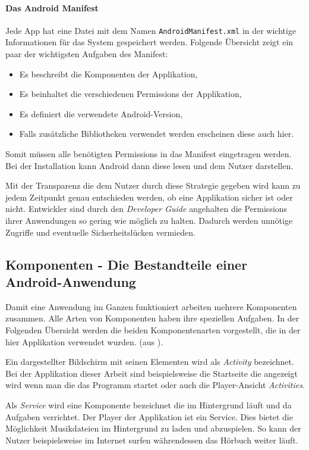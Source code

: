 \paragraph{Das Android Manifest}
Jede App hat eine Datei mit dem Namen \verb+AndroidManifest.xml+ in der wichtige Informationen für das System gespeichert werden. Folgende Übersicht zeigt ein paar der wichtigsten Aufgaben des Manifest:

\begin{itemize}
	\item Es beschreibt die Komponenten der Applikation,
	\item Es beinhaltet die verschiedenen Permissions der Applikation,
	\item Es definiert die verwendete Android-Version,
	\item Falls zusätzliche Bibliotheken verwendet werden erscheinen diese auch hier.
\end{itemize}

Somit müssen alle benötigten Permissions in das Manifest eingetragen werden. Bei der Installation kann Android dann diese lesen und dem Nutzer darstellen.

Mit der Transparenz die dem Nutzer durch diese Strategie gegeben wird kann zu jedem Zeitpunkt genau entschieden werden, ob eine Applikation sicher ist oder nicht. Entwickler sind durch den \emph{Developer Guide} \cite{android_api} angehalten die Permissions ihrer Anwendungen so gering wie möglich zu halten. Dadurch werden unnötige Zugriffe und eventuelle Sicherheitslücken vermieden.

\subsection{Komponenten - Die Bestandteile einer Android-Anwendung}
\label{components}
Damit eine Anwendung im Ganzen funktioniert arbeiten mehrere Komponenten zusammen. Alle Arten von Komponenten haben ihre speziellen Aufgaben. In der Folgenden Übersicht werden die beiden Komponentenarten vorgestellt, die in der hier Applikation verwendet wurden. (aus \cite{android_components}).

\begin{description}[style=nextline]
	\item[Activities] Ein dargestellter Bildschirm mit seinen Elementen wird als \emph{Activity} bezeichnet. Bei der Applikation dieser Arbeit sind beispielsweise die Startseite die angezeigt wird wenn man die das Programm startet oder auch die Player-Ansicht \emph{Activities}.
	\item[Services] Als \emph{Service} wird eine Komponente bezeichnet die im Hintergrund läuft und da Aufgaben verrichtet. Der Player der Applikation ist ein Service. Dies bietet die Möglichkeit Musikdateien im Hintergrund zu laden und abzuspielen. So kann der Nutzer beispielsweise im Internet surfen währendessen das Hörbuch weiter läuft.
\end{description}

